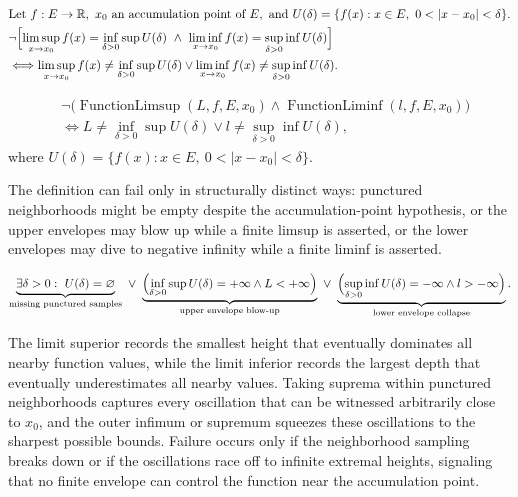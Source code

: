 \begin{remark*}
\[
\begin{aligned}
&\text{Let } f:E\to\mathbb{R},\ x_0 \text{ an accumulation point of } E,\ \text{and } U(\delta)=\{f(x):x\in E,\ 0<|x-x_0|<\delta\}.\\
&\neg\Bigl[\limsup_{x\to x_0} f(x)=\inf_{\delta>0}\sup U(\delta)\ \land\ \liminf_{x\to x_0} f(x)=\sup_{\delta>0}\inf U(\delta)\Bigr]\\
&\Longleftrightarrow
\limsup_{x\to x_0} f(x)\ne\inf_{\delta>0}\sup U(\delta)
\lor
\liminf_{x\to x_0} f(x)\ne\sup_{\delta>0}\inf U(\delta).
\end{aligned}
\]
\end{remark*}

\begin{remark*}
\[
\begin{aligned}
&\neg\bigl(\operatorname{FunctionLimsup}(L,f,E,x_0)\land \operatorname{FunctionLiminf}(l,f,E,x_0)\bigr)\\
&\Longleftrightarrow
L\ne\inf_{\delta>0}\sup U(\delta)
\lor
l\ne\sup_{\delta>0}\inf U(\delta),
\end{aligned}
\]
where $U(\delta)=\{f(x):x\in E,\ 0<|x-x_0|<\delta\}$.
\end{remark*}

\begin{remark*}
The definition can fail only in structurally distinct ways: punctured neighborhoods might be empty despite the accumulation-point hypothesis, or the upper envelopes may blow up while a finite limsup is asserted, or the lower envelopes may dive to negative infinity while a finite liminf is asserted.
\end{remark*}

\begin{remark*}
\[
\underbrace{\exists \delta>0:\ U(\delta)=\varnothing}_{\text{missing punctured samples}}
\ \lor\
\underbrace{\Bigl(\inf_{\delta>0}\sup U(\delta)=+\infty \land L<+\infty\Bigr)}_{\text{upper envelope blow-up}}
\ \lor\
\underbrace{\Bigl(\sup_{\delta>0}\inf U(\delta)=-\infty \land l>-\infty\Bigr)}_{\text{lower envelope collapse}}.
\]
\end{remark*}

\begin{remark*}[Interpretation]
The limit superior records the smallest height that eventually dominates all nearby function values, while the limit inferior records the largest depth that eventually underestimates all nearby values. Taking suprema within punctured neighborhoods captures every oscillation that can be witnessed arbitrarily close to $x_0$, and the outer infimum or supremum squeezes these oscillations to the sharpest possible bounds. Failure occurs only if the neighborhood sampling breaks down or if the oscillations race off to infinite extremal heights, signaling that no finite envelope can control the function near the accumulation point.
\end{remark*}

